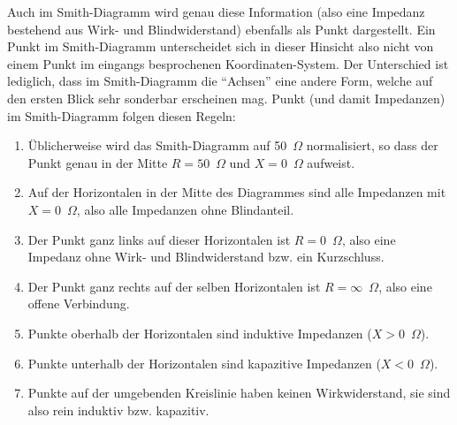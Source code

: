 \documentclass[twoside,a4paper,11pt,halfparskip,DIV=11,notitlepage]{scrartcl}
\newcommand{\Ohm}{$\Omega$\xspace}
\begin{document}
Auch im Smith-Diagramm wird genau diese Information (also eine Impedanz bestehend aus Wirk- und Blindwiderstand)
ebenfalls als Punkt dargestellt. Ein Punkt im Smith-Diagramm unterscheidet sich in dieser Hinsicht also nicht
von einem Punkt im eingangs besprochenen Koordinaten-System. Der Unterschied ist lediglich, dass im Smith-Diagramm
die ``Achsen'' eine andere Form, welche auf den ersten Blick sehr sonderbar erscheinen mag. Punkt (und damit Impedanzen)
im Smith-Diagramm folgen diesen Regeln:


\begin{enumerate}
\item Üblicherweise wird das Smith-Diagramm auf 50~$\Omega$ normalisiert, so dass
    der Punkt genau in der Mitte $R=50$~\Ohm und $X=0$~\Ohm aufweist.
\item Auf der Horizontalen in der Mitte des Diagrammes sind alle Impedanzen mit $X=0$~\Ohm, also alle Impedanzen
    ohne Blindanteil.
\item Der Punkt ganz links auf dieser Horizontalen ist $R=0$~\Ohm, also eine Impedanz ohne Wirk- und Blindwiderstand
    bzw. ein Kurzschluss.
\item Der Punkt ganz rechts auf der selben Horizontalen ist $R=\infty$~\Ohm, also eine offene Verbindung.
\item Punkte oberhalb der Horizontalen sind induktive Impedanzen ($X>0$~\Ohm).
\item Punkte unterhalb der Horizontalen sind kapazitive Impedanzen ($X<0$~\Ohm).
\item Punkte auf der umgebenden Kreislinie haben keinen Wirkwiderstand, sie sind also rein induktiv bzw. kapazitiv.
\end{enumerate}
\end{document}
